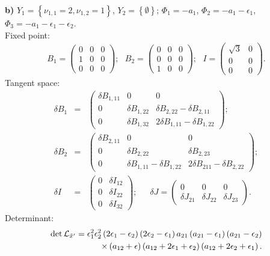 \documentclass[a4paper,12pt]{article}
\begin{document}
{\bf b)} $Y_1=\left\{\nu_{1,1}=2, \nu_{1,2}=1 \right\}$,
$Y_2=\left\{\emptyset\right\}$; $\Phi_1=-a_1$,
$\Phi_2=-a_1-\epsilon_1$, $\Phi_3=-a_1-\epsilon_1-\epsilon_2$. \\
Fixed point:
\begin{eqnarray}
B_1=\left(\begin{array}{ccc} 0 & 0 & 0\\ 1 & 0 & 0 \\ 0 & 0 & 0
\end{array}\right); \, \, \, \,
B_2=\left(\begin{array}{ccc} 0 & 0 & 0\\ 0 & 0 & 0 \\ 1 & 0 & 0
\end{array}\right);  \, \, \, \, I=\left(\begin{array}{cc} \sqrt{3} & 0 \\ 0 & 0 \\0 & 0
\end{array}\right).
\end{eqnarray}
Tangent space:
\begin{eqnarray}
\delta B_1 &=& \left(\begin{array}{ccc} \delta B_{1,11} & 0 & 0 \\ 0 & \delta B_{1,22} & \delta B_{2,22}-\delta
B_{2,11}\\0 & \delta B_{1,32} & 2 \delta B_{1,11}-\delta B_{1,22}
\end{array}\right); \nonumber \\
\delta B_2 &=&\left(\begin{array}{ccc} \delta B_{2,11} & 0 & 0 \\ 0 & \delta B_{2,22} & \delta B_{2,23} \\
0 & \delta B_{1,11}-\delta B_{1,22} & 2 \delta B_{211}-\delta B_{2,22}
\end{array}\right); \nonumber \\
\delta I &=& \left(\begin{array}{cc} 0 & \delta I_{12} \\ 0 & \delta I_{22} \\ 0 & \delta I_{32}
\end{array}\right); \, \, \, \, \, \, \, \, \,
\delta J=\left(\begin{array}{ccc} 0 & 0 & 0 \\ \delta J_{21} & \delta J_{22} & \delta J_{23}
\end{array}\right).
\end{eqnarray}
Determinant:
\begin{eqnarray}
\det {\cal L}_{{\tilde x}'}=\epsilon_1^2 \epsilon_2^2 \left(2
\epsilon_1-\epsilon_2\right)\left(2
\epsilon_2-\epsilon_1\right)a_{21}\left(a_{21}-\epsilon_1 \right)\left(a_{21}-\epsilon_2 \right) \nonumber \\
\times \left(a_{12}+\epsilon \right)\left(a_{12}+2 \epsilon_1 +\epsilon_2 \right)\left(a_{12}+2 \epsilon_2
+\epsilon_1 \right).
\end{eqnarray}
\end{document}
